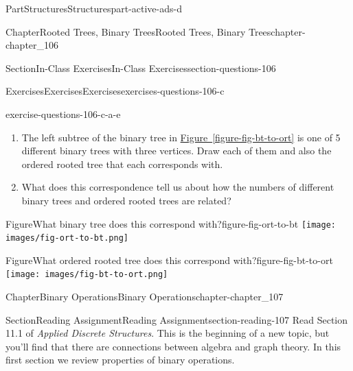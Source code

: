 \documentclass[oneside,10pt,]{book}
\newcommand{\xreffont}{\relax}
\numberwithin{equation}{section}
\begin{document}
\begin{partptx}{Part}{Structures}{}{Structures}{}{}{part-active-ads-d}
\begin{chapterptx}{Chapter}{Rooted Trees, Binary Trees}{}{Rooted Trees, Binary Trees}{}{}{chapter-chapter_106}
\begin{sectionptx}{Section}{In-Class Exercises}{}{In-Class Exercises}{}{}{section-questions-106}
\begin{exercises-subsection-numberless}{Exercises}{Exercises}{}{Exercises}{}{}{exercises-questions-106-c}
\begin{exercisegroup}
\begin{divisionexerciseeg}{5}{}{}{exercise-questions-106-c-a-e}
\begin{enumerate}[label=(\alph*)]
\item{}The left subtree of the binary tree in \hyperref[figure-fig-bt-to-ort]{Figure~{\xreffont\ref{figure-fig-bt-to-ort}}} is one of 5 different binary trees with three vertices.  Draw each of them and also the ordered rooted tree that each corresponds with.%
\item{}What does this correspondence tell us about how the numbers of different binary trees and ordered rooted trees are related?%
\end{enumerate}
%
\begin{sidebyside}{2}{0}{0}{0}%
\begin{sbspanel}{0.5}%
\begin{panelfigureptx}{Figure}{What binary tree does this correspond with?}{figure-fig-ort-to-bt}{}%
\texttt{[image: images/fig-ort-to-bt.png]}
\tcblower
\end{panelfigureptx}%
\end{sbspanel}%
\begin{sbspanel}{0.5}%
\begin{panelfigureptx}{Figure}{What ordered rooted tree does this correspond with?}{figure-fig-bt-to-ort}{}%
\texttt{[image: images/fig-bt-to-ort.png]}
\tcblower
\end{panelfigureptx}%
\end{sbspanel}%
\end{sidebyside}%
\end{divisionexerciseeg}%
\end{exercisegroup}
\par\medskip\noindent
\end{exercises-subsection-numberless}
\end{sectionptx}
\end{chapterptx}
%
\typeout{************************************************}
\typeout{************************************************}
%
\begin{chapterptx}{Chapter}{Binary Operations}{}{Binary Operations}{}{}{chapter-chapter_107}
\renewcommand*{\chaptername}{Chapter}
\index{}%
%
%
\typeout{************************************************}
\typeout{************************************************}
%
\begin{sectionptx}{Section}{Reading Assignment}{}{Reading Assignment}{}{}{section-reading-107}
Read Section 11.1 of \emph{Applied Discrete Structures}. This is the beginning of a new topic, but you'll find that there are connections between algebra and graph theory.   In this first section we review properties of binary operations.%

\end{sectionptx}
\end{chapterptx}
\end{partptx}
\end{document}
